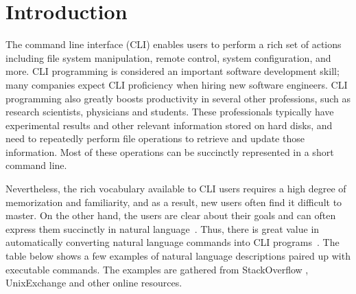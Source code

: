 \section{Introduction}


The command line interface (CLI) enables users to perform a rich set of actions including file system manipulation, remote control, system configuration, and more. CLI programming is considered an important software development skill; many companies expect CLI proficiency when hiring new software engineers. CLI programming also greatly boosts productivity in several other professions, such as research scientists, physicians and students. These professionals typically have experimental results and other relevant information stored on hard disks, and need to repeatedly perform file operations to retrieve and update those information. Most of these operations can be succinctly represented in a short command line.

Nevertheless, the rich vocabulary available to CLI users requires a high degree of memorization and familiarity, and as a result, new users often find it difficult to master. On the other hand, %
the users are clear about their goals and can often express them succinctly in natural language~\cite{Myers:2004:NPL:1015864.1015888}. Thus, there is great value in automatically converting natural language commands into CLI programs~\cite{Pederson-Report,Manaris:1994:DNL:198125.198137,ZOLTANFORD1991527}. The table below shows a few examples of natural language descriptions paired up with executable commands. The examples are gathered from StackOverflow
, UnixExchange 
and other online resources.


